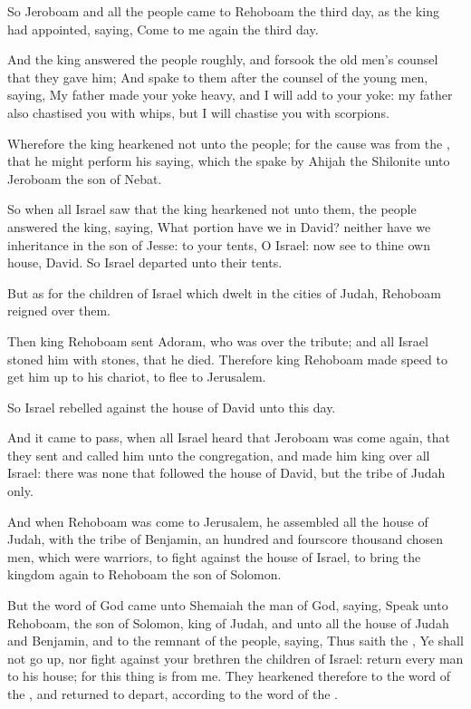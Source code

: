 \verse So Jeroboam and all the people came to Rehoboam the third day, as the king had appointed, saying, Come to me again the third day.

\verse And the king answered the people roughly, and forsook the old men's counsel that they gave him; \verse And spake to them after the counsel of the young men, saying, My father made your yoke heavy, and I will add to your yoke: my father also chastised you with whips, but I will chastise you with scorpions.

\verse Wherefore the king hearkened not unto the people; for the cause was from the \LORD, that he might perform his saying, which the \LORD spake by Ahijah the Shilonite unto Jeroboam the son of Nebat.

\verse So when all Israel saw that the king hearkened not unto them, the people answered the king, saying, What portion have we in David?  neither have we inheritance in the son of Jesse: to your tents, O Israel: now see to thine own house, David. So Israel departed unto their tents.

\verse But as for the children of Israel which dwelt in the cities of Judah, Rehoboam reigned over them.

\verse Then king Rehoboam sent Adoram, who was over the tribute; and all Israel stoned him with stones, that he died. Therefore king Rehoboam made speed to get him up to his chariot, to flee to Jerusalem.

\verse So Israel rebelled against the house of David unto this day.

\verse And it came to pass, when all Israel heard that Jeroboam was come again, that they sent and called him unto the congregation, and made him king over all Israel: there was none that followed the house of David, but the tribe of Judah only.

\verse And when Rehoboam was come to Jerusalem, he assembled all the house of Judah, with the tribe of Benjamin, an hundred and fourscore thousand chosen men, which were warriors, to fight against the house of Israel, to bring the kingdom again to Rehoboam the son of Solomon.

\verse But the word of God came unto Shemaiah the man of God, saying, \verse Speak unto Rehoboam, the son of Solomon, king of Judah, and unto all the house of Judah and Benjamin, and to the remnant of the people, saying, \verse Thus saith the \LORD, Ye shall not go up, nor fight against your brethren the children of Israel: return every man to his house; for this thing is from me. They hearkened therefore to the word of the \LORD, and returned to depart, according to the word of the \LORD.

